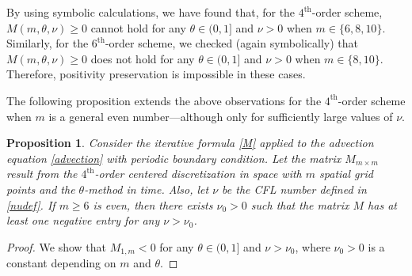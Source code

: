 \documentclass[a4paper]{article}
\newtheorem{proposition}{Proposition}
\begin{document}
\begin{description}[style=unboxed,leftmargin=0cm]
\item [{Case 1:} $m$ is {even}.]
\item \noindent By using symbolic calculations,  we have found that, for the $4^\text{th}$-order scheme, 
$M(m,\theta,\nu)\ge 0$ cannot hold for any $\theta\in(0,1]$ and $\nu>0$ when $m\in\{6,8,10\}$.
Similarly, for the $6^\text{th}$-order scheme, we checked (again symbolically) that $M(m,\theta,\nu)\ge 0$
does not hold for any $\theta\in(0,1]$ and $\nu>0$ when $m\in\{8,10\}$.
Therefore, positivity preservation is impossible in these cases.

The following proposition extends the above observations for the $4^\text{th}$-order scheme when $m$ is a
general even number---although only for sufficiently large values of $\nu$.
\begin{proposition}\label{m_even_nonpositivityFE}
	Consider the iterative formula \eqref{M} applied to the advection equation \eqref{advection} with periodic
	boundary condition.
	Let the matrix $M_{m \times m}$ result from the $4^\text{th}$-order centered discretization in space with
	$m$ spatial grid points and the $\theta$-method in time.
	Also, let $\nu$ be the CFL number defined in \eqref{nudef}.
	If $m \ge 6$ is \emph{even}, then there exists $\nu_0  > 0$ such that the matrix $M$ has at least one
	negative entry for any $\nu > \nu_0$.
\end{proposition}
\begin{proof}
	We show that $M_{1,m} < 0$ for any $\theta \in (0,1]$ and $\nu > \nu_0$,
	where $\nu_0 > 0$ is a constant depending on $m$ and $\theta$.
	

\end{proof}
\end{description}
\end{document}
